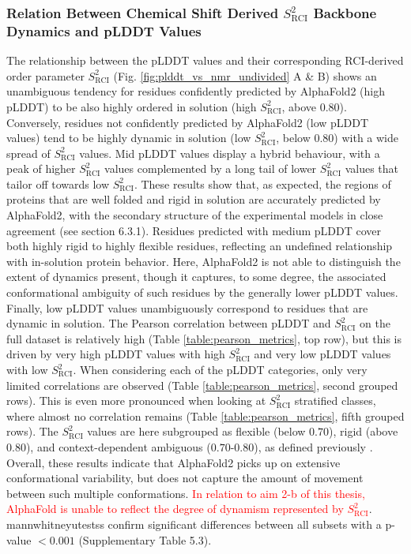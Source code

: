 \subsubsection{Relation Between Chemical Shift Derived $S^{2}_{\text{RCI}}$ Backbone Dynamics and pLDDT Values}

The relationship between the pLDDT values and their corresponding RCI-derived order parameter $S^{2}_{\text{RCI}}$ (Fig. \ref{fig:plddt_vs_nmr_undivided} A \& B) shows an unambiguous tendency for residues confidently predicted by AlphaFold2 (high pLDDT) to be also highly ordered in solution (high $S^{2}_{\text{RCI}}$, above 0.80). Conversely, residues not confidently predicted by AlphaFold2 (low pLDDT values) tend to be highly dynamic in solution (low $S^{2}_{\text{RCI}}$, below 0.80) with a wide spread of $S^{2}_{\text{RCI}}$ values. Mid pLDDT values display a hybrid behaviour, with a peak of higher $S^{2}_{\text{RCI}}$ values complemented by a long tail of lower $S^{2}_{\text{RCI}}$ values that tailor off towards low $S^{2}_{\text{RCI}}$. These results show that, as expected, the regions of proteins that are well folded and rigid in solution are accurately predicted by AlphaFold2, with the secondary structure of the experimental models in close agreement (see section 6.3.1). Residues predicted with medium pLDDT cover both highly rigid to highly flexible residues, reflecting an undefined relationship with in-solution protein behavior. Here, AlphaFold2 is not able to distinguish the extent of dynamics present, though it captures, to some degree, the associated conformational ambiguity of such residues by the generally lower pLDDT values. Finally, low pLDDT values unambiguously correspond to residues that are dynamic in solution. The Pearson correlation between pLDDT and $S^{2}_{\text{RCI}}$ on the full dataset is relatively high (Table \ref{table:pearson_metrics}, top row), but this is driven by very high pLDDT values with high $S^{2}_{\text{RCI}}$ and very low pLDDT values with low $S^{2}_{\text{RCI}}$. When considering each of the pLDDT categories, only very limited correlations are observed (Table \ref{table:pearson_metrics}, second grouped rows). This is even more pronounced when looking at $S^{2}_{\text{RCI}}$ stratified classes, where almost no correlation remains (Table \ref{table:pearson_metrics}, fifth grouped rows). The \(S^{2}_{\text{RCI}}\) values are here subgrouped as flexible (below $0.70$), rigid (above $0.80$), and context-dependent ambiguous ($0.70$-$0.80$), as defined previously \cite{cilia_dynamine_2014}. Overall, these results indicate that AlphaFold2 picks up on extensive conformational variability, but does not capture the amount of movement between such multiple conformations. \textcolor{red}{In relation to aim 2-b of this thesis, AlphaFold is unable to reflect the degree of dynamism represented by $S^{2}_{\text{RCI}}$}. \glspl{mannwhitneyutest}s confirm significant differences between all subsets with a p-value \( < 0.001 \) (Supplementary Table 5.3).

